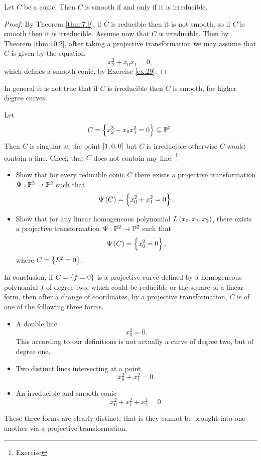 \begin{corollary}
\label{cor:10.4}
Let $ C $ be a conic. Then $ C $ is smooth if and only if it is irreducible.
\end{corollary}

\begin{proof}
By Theorem \ref{thm:7.9}, if $ C $ is reducible then it is not smooth, so if $ C $ is smooth then it is irreducible. Assume now that $ C $ is irreducible. Then by Theorem \ref{thm:10.2}, after taking a projective transformation we may assume that $ C $ is given by the equation
$$ x_2^2 + x_0x_1 = 0, $$
which defines a smooth conic, by Exercise \ref{ex:29}.
\end{proof}

\begin{remark}
In general it is not true that if $ C $ is irreducible then $ C $ is smooth, for higher degree curves.
\end{remark}

\begin{example}
Let
$$ C = \cbr{x_2^3 - x_0x_1^2 = 0} \subseteq \PP^2. $$
Then $ C $ is singular at the point $ \sbr{1, 0, 0} $ but $ C $ is irreducible otherwise $ C $ would contain a line. Check that $ C $ does not contain any line. \footnote{Exercise}
\end{example}

\begin{exercise**}
\label{ex:30}
\hfill
\begin{itemize}
\item Show that for every reducible conic $ C $ there exists a projective transformation $ \Psi : \mathbb{P}^2 \to \mathbb{P}^2 $ such that
$$ \Psi\br{C} = \cbr{x_0^2 + x_1^2 = 0}. $$
\item Show that for any linear homogeneous polynomial $ L\br{x_0, x_1, x_2} $, there exists a projective transformation $ \Psi : \mathbb{P}^2 \to \mathbb{P}^2 $ such that
$$ \Psi\br{C} = \cbr{x_0^2 = 0}, $$
where $ C = \cbr{L^2 = 0} $.
\end{itemize}
\end{exercise**}

\pagebreak

In conclusion, if $ C = \cbr{f = 0} $ is a projective curve defined by a homogeneous polynomial $ f $ of degree two, which could be reducible or the square of a linear form, then after a change of coordinates, by a projective transformation, $ C $ is of one of the following three forms.
\begin{itemize}
\item A double line
$$ x_0^2 = 0. $$
This according to our definitions is not actually a curve of degree two, but of degree one.
\item Two distinct lines intersecting at a point
$$ x_0^2 + x_1^2 = 0. $$
\item An irreducible and smooth conic
$$ x_0^2 + x_1^2 + x_2^2 = 0. $$
\end{itemize}
These three forms are clearly distinct, that is they cannot be brought into one another via a projective transformation.

